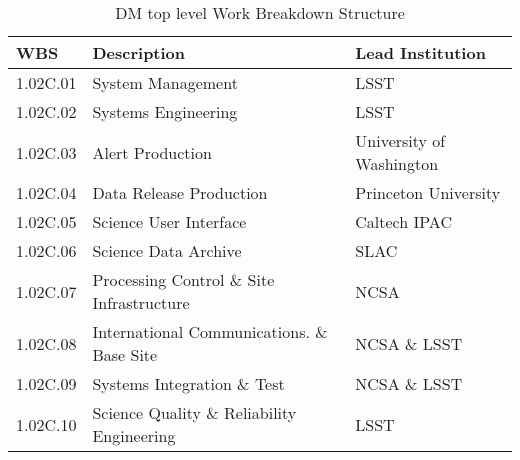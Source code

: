 \begin{table}
\caption{DM top level Work Breakdown Structure \label{tab:wbs}}
\begin{tabular}[htb]{l|l|l}\\ \hline
{\bf WBS}    &  {\bf Description}   &                            {\bf Lead Institution}\\ \hline
	1.02C.01& System Management                       &  LSST\\ \hline
	1.02C.02& Systems Engineering                     &  LSST\\ \hline
	1.02C.03& Alert Production                        &  University of Washington\\ \hline
	1.02C.04& Data Release Production                 &  Princeton University\\ \hline
	1.02C.05& Science User Interface                  &  Caltech IPAC\\ \hline
	1.02C.06& Science Data Archive                    &  SLAC\\ \hline
	1.02C.07& Processing Control \& Site Infrastructure & NCSA\\ \hline
	1.02C.08& International Communications. \& Base Site& NCSA \& LSST\\ \hline
	1.02C.09& Systems Integration \& Test               & NCSA \& LSST\\ \hline
	1.02C.10& Science Quality \& Reliability Engineering& LSST\\ \hline
\end{tabular}
\end{table}



